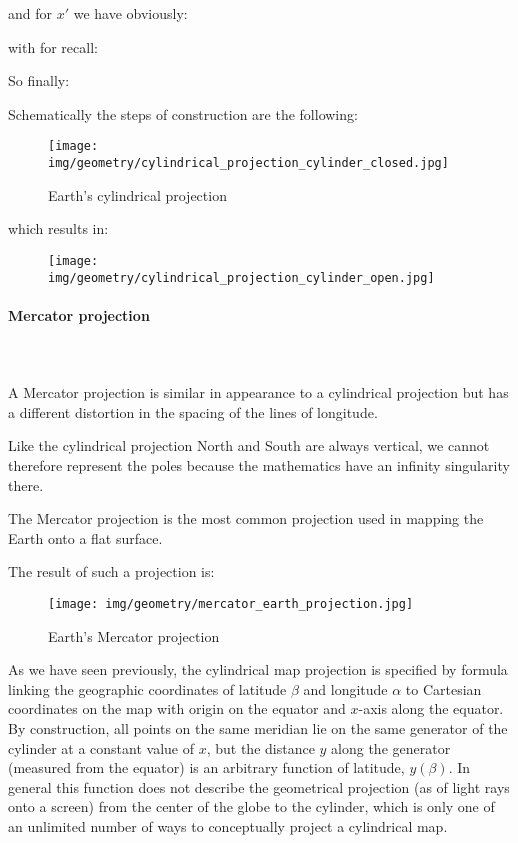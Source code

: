 	and for $x'$ we have obviously:
	
	with for recall:
	
	So finally:
	
	Schematically the steps of construction are the following:
	\begin{figure}[H]
		\centering
		\texttt{[image: img/geometry/cylindrical\_projection\_cylinder\_closed.jpg]}
		\caption{Earth's cylindrical projection}
	\end{figure}
	which results in:
	\begin{figure}[H]
		\centering
		\texttt{[image: img/geometry/cylindrical\_projection\_cylinder\_open.jpg]}
	\end{figure}
	
	\paragraph{Mercator projection}\mbox{}\\\\
	A Mercator projection is similar in appearance to a cylindrical projection but has a different distortion in the spacing of the lines of longitude. 

	Like the cylindrical projection North and South are always vertical, we cannot therefore represent the poles because the mathematics have an infinity singularity there.

	The Mercator projection is the most common projection used in mapping the Earth onto a flat surface. 
	
	The result of such a projection is:
	\begin{figure}[H]
		\centering
		\texttt{[image: img/geometry/mercator\_earth\_projection.jpg]}
		\caption{Earth's Mercator projection}
	\end{figure}
	As we have seen previously, the cylindrical map projection is specified by formula linking the geographic coordinates of latitude $\beta$ and longitude $\alpha$ to Cartesian coordinates on the map with origin on the equator and $x$-axis along the equator. By construction, all points on the same meridian lie on the same generator of the cylinder at a constant value of $x$, but the distance $y$ along the generator (measured from the equator) is an arbitrary function of latitude, $y(\beta)$. In general this function does not describe the geometrical projection (as of light rays onto a screen) from the center of the globe to the cylinder, which is only one of an unlimited number of ways to conceptually project a cylindrical map.
	
